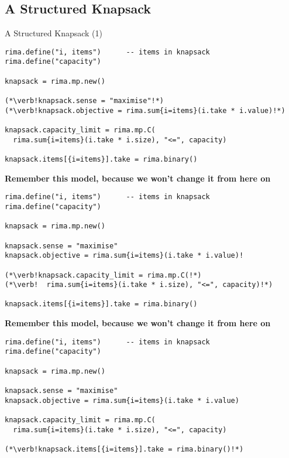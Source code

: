 \documentclass[smaller]{beamer}
\begin{document}
\subsection{A Structured Knapsack}
\begin{frame}[fragile]{A Structured Knapsack (1)}
  \vspace{-2ex}
  \begin{overprint}%
%
  \begin{lstlisting}
rima.define("i, items")      -- items in knapsack
rima.define("capacity")

knapsack = rima.mp.new()
 
(*\verb!knapsack.sense = "maximise"!*)
(*\verb!knapsack.objective = rima.sum{i=items}(i.take * i.value)!*)

knapsack.capacity_limit = rima.mp.C(
  rima.sum{i=items}(i.take * i.size), "<=", capacity)

knapsack.items[{i=items}].take = rima.binary()
  \end{lstlisting}

  \bf{Remember this model, because we won't change it from here on}

  \begin{lstlisting}
rima.define("i, items")      -- items in knapsack
rima.define("capacity")

knapsack = rima.mp.new()
 
knapsack.sense = "maximise"
knapsack.objective = rima.sum{i=items}(i.take * i.value)!

(*\verb!knapsack.capacity_limit = rima.mp.C(!*)
(*\verb!  rima.sum{i=items}(i.take * i.size), "<=", capacity)!*)

knapsack.items[{i=items}].take = rima.binary()
  \end{lstlisting}

  \bf{Remember this model, because we won't change it from here on}

  \begin{lstlisting}
rima.define("i, items")      -- items in knapsack
rima.define("capacity")

knapsack = rima.mp.new()
 
knapsack.sense = "maximise"
knapsack.objective = rima.sum{i=items}(i.take * i.value)

knapsack.capacity_limit = rima.mp.C(
  rima.sum{i=items}(i.take * i.size), "<=", capacity)

(*\verb!knapsack.items[{i=items}].take = rima.binary()!*)
  \end{lstlisting}


\end{overprint}
\end{frame}
\end{document}
